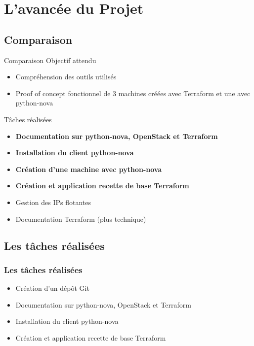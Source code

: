 \documentclass[11pt]{beamer} %
\begin{document}
	\section{L'avancée du Projet}
	
	\subsection{Comparaison}
		
		\begin{frame}{Comparaison}
		Objectif attendu 
			\begin{itemize}
				\item Compréhension des outils utilisés
				\item Proof of concept fonctionnel de 3 machines créées avec Terraform et une avec python-nova
			\end{itemize}
		Tâches réalisées
				\begin{itemize}
					\item \textbf{Documentation sur python-nova, OpenStack et Terraform}
					\item \textbf{Installation du client python-nova}
					\item \textbf{Création d'une machine avec python-nova}
					\item \textbf{Création et application recette de base Terraform}
					\item Gestion des IPs flotantes
					\item Documentation Terraform (plus technique)
				\end{itemize}
		\end{frame}
			
		
		
		\subsection{Les tâches réalisées}
			\begin{frame}
				\frametitle{Les tâches réalisées}
				\begin{itemize}
					\item Création d'un dépôt Git
					\item Documentation sur python-nova, OpenStack et Terraform
					\item Installation du client python-nova
					\item Création et application recette de base Terraform
				\end{itemize}
			\end{frame}
		
\end{document}
